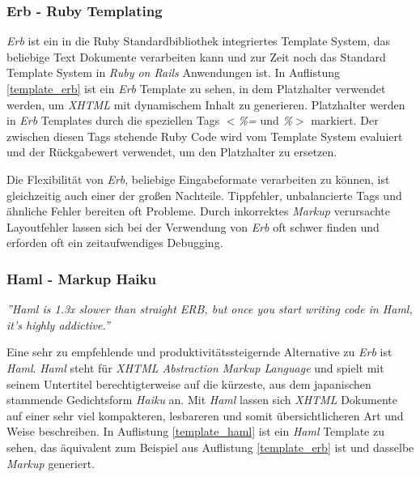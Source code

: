 \subsubsection{Erb - Ruby Templating}

\textit{Erb} ist ein in die Ruby Standardbibliothek integriertes
Template System, das beliebige Text Dokumente verarbeiten kann und zur
Zeit noch das Standard Template System in \textit{Ruby on Rails}
Anwendungen ist. In Auflistung \ref{template_erb} ist ein \textit{Erb}
Template zu sehen, in dem Platzhalter verwendet werden, um
\textit{XHTML}  mit dynamischem Inhalt zu generieren. Platzhalter werden
in \textit{Erb} Templates durch die speziellen Tags \textit{$<$\%=}
und \textit{\%$>$} markiert. Der zwischen diesen Tags stehende Ruby
Code wird vom Template System evaluiert und der Rückgabe\-wert
verwendet, um den Platzhalter zu ersetzen.



Die Flexibilität von \textit{Erb}, beliebige Eingabeformate
verarbeiten zu können, ist gleichzeitig auch einer der großen
Nachteile. Tippfehler, unbalancierte Tags und ähnliche Fehler bereiten
oft Probleme. Durch inkorrektes \textit{Markup} verursachte Layoutfehler lassen
sich bei der Verwendung von \textit{Erb} oft schwer finden und
erforden oft ein zeitaufwendiges Debugging.

\subsubsection{Haml - Markup Haiku}

\textit{''Haml is 1.3x slower than straight ERB, but once you start
  writing code in Haml, it’s highly addictive.''}

Eine sehr zu empfehlende und produktivitätssteigernde Alternative zu
\textit{Erb} ist \textit{Haml}. \textit{Haml} steht für \textit{XHTML
  Abstraction Markup Language} und spielt mit seinem Untertitel
berechtigterweise auf die kürzeste, aus dem japanischen stammende
Gedichtsform \textit{Haiku} an. Mit \textit{Haml} lassen sich
\textit{XHTML} Dokumente auf einer sehr viel kompakteren, lesbareren
und somit übersichtlicheren Art und Weise beschreiben. In Auflistung
\ref{template_haml} ist ein \textit{Haml} Template zu sehen, das
äquivalent zum Beispiel aus Auflistung \ref{template_erb} ist und
dasselbe \textit{Markup} generiert.


